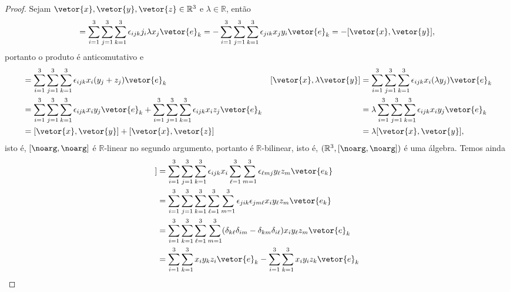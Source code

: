 \begin{proof}
    Sejam \(\vetor{x}, \vetor{y}, \vetor{z} \in \mathbb{R}^3\) e \(\lambda \in \mathbb{R}\), então
    \begin{equation*}
        [\vetor{y}, \vetor{x}] = \sum_{i = 1}^3 \sum_{j = 1}^3\sum_{k = 1}^3 \epsilon_{ijk} j_i \lambda x_j \vetor{e}_k
                               = -\sum_{i = 1}^3 \sum_{j = 1}^3\sum_{k = 1}^3 \epsilon_{jik} x_j y_i \vetor{e}_k
                               = -[\vetor{x}, \vetor{y}],
    \end{equation*}
    portanto o produto é anticomutativo e
    \begin{align*}
        [\vetor{x}, \vetor{y} + \vetor{z}] &= \sum_{i = 1}^3 \sum_{j = 1}^3\sum_{k = 1}^3 \epsilon_{ijk}x_i (y_j + z_j) \vetor{e}_k&
        [\vetor{x}, \lambda \vetor{y}] &= \sum_{i = 1}^3 \sum_{j = 1}^3\sum_{k = 1}^3 \epsilon_{ijk} x_i (\lambda y_j) \vetor{e}_k\\
                                           &= \sum_{i = 1}^3 \sum_{j = 1}^3\sum_{k = 1}^3 \epsilon_{ijk} x_i y_j \vetor{e}_k + \sum_{i = 1}^3 \sum_{j = 1}^3\sum_{k = 1}^3 \epsilon_{ijk}x_iz_j \vetor{e}_k&
                                           &= \lambda\sum_{i = 1}^3 \sum_{j = 1}^3\sum_{k = 1}^3 \epsilon_{ijk} x_i y_j \vetor{e}_k\\
                                           &= [\vetor{x}, \vetor{y}] + [\vetor{x}, \vetor{z}]&
                                           &= \lambda [\vetor{x}, \vetor{y}],
    \end{align*}
    isto é, \([\noarg, \noarg]\) é \(\mathbb{R}\)-linear no segundo argumento, portanto é \(\mathbb{R}\)-bilinear, isto é, \((\mathbb{R}^3, [\noarg, \noarg])\) é uma álgebra. Temos ainda
    \begin{align*}
        [\vetor{x}, [\vetor{y}, \vetor{z}]]
        &= \sum_{i = 1}^3\sum_{j = 1}^3\sum_{k = 1}^3 \epsilon_{ijk} x_i \sum_{\ell = 1}^3 \sum_{m = 1}^3 \epsilon_{\ell m j}y_\ell z_m \vetor{e_k}\\
        &= \sum_{i = 1}^3\sum_{j = 1}^3\sum_{k = 1}^3 \sum_{\ell = 1}^3 \sum_{m = 1}^3\epsilon_{jik} \epsilon_{jm\ell}x_i  y_\ell z_m \vetor{e_k}\\
        &= \sum_{i = 1}^3 \sum_{k = 1}^3 \sum_{\ell = 1}^3 \sum_{m = 1}^3 (\delta_{k \ell} \delta_{im} - \delta_{km}\delta_{i\ell}) x_i y_\ell z_m \vetor{e}_k\\
        &= \sum_{i = 1}^3 \sum_{k = 1}^3 x_i y_k z_i \vetor{e}_k - \sum_{i = 1}^3 \sum_{k = 1}^3 x_i y_i z_k \vetor{e}_k\\

\end{align*}
\end{proof}
